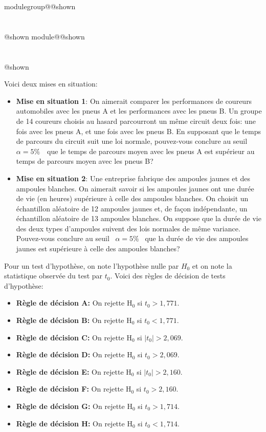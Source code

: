 \documentclass{Evaluation}
\makeatletter
\newcommand{\currentmodulekey}{}
\newcommand{\currentmoduletitle}{}
\newcommand{\currentgroupkey}{}
\newcommand{\currentgrouptitle}{}
\newcommand{\showmoduleifneeded}{%
  \ifx\currentgroupkey\empty\else
    \expandafter\ifx\csname modulegroup@\currentgroupkey @shown\endcsname\relax
      \section*{\currentgrouptitle}%
      \expandafter\gdef\csname modulegroup@\currentgroupkey @shown\endcsname{1}%
    \fi
  \fi
  \expandafter\ifx\csname module@\currentmodulekey @shown\endcsname\relax
    \section*{\currentmoduletitle}%
    \expandafter\gdef\csname module@\currentmodulekey @shown\endcsname{1}%
  \fi
}
\newenvironment{A23}{\showmoduleifneeded}{}
\makeatother
\begin{document}
\begin{questions}
\begin{A23}
\question {} %
Voici deux mises en situation:
\begin{itemize}
    \item {\bf Mise en situation 1}: On aimerait comparer les performances de coureurs automobiles avec les pneus A et les performances avec les pneus B. Un groupe de 14 coureurs choisis au hasard parcourront un même circuit deux fois: une fois avec les pneus A, et une fois avec les pneus B. En supposant que le temps de parcours du circuit suit une loi normale, pouvez-vous conclure au seuil  $\alpha=5\%$  que le temps de parcours moyen avec les pneus A est supérieur au temps de parcours moyen avec les pneus B?
    \item {\bf Mise en situation 2}: Une entreprise fabrique des ampoules jaunes et des ampoules blanches. On aimerait savoir si les ampoules jaunes ont une durée de vie (en heures) supérieure à celle des ampoules blanches. On choisit un échantillon aléatoire de 12 ampoules jaunes et, de façon indépendante, un échantillon aléatoire de 13 ampoules blanches. On suppose que la durée de vie des deux types d'ampoules suivent des lois normales de même variance. Pouvez-vous conclure au seuil  $\alpha=5\%$  que la durée de vie des ampoules jaunes est supérieure à celle des ampoules blanches?
\end{itemize}

Pour un test d'hypothèse, on note l'hypothèse nulle par $H_0$ et on note la statistique observée du test par $t_0$. Voici des règles de décision de tests d'hypothèse:

\begin{itemize}

        \item {\bf Règle de décision A:} On rejette $\mathrm{H}_0$ si $t_0 > 1,771$.
    \item {\bf Règle de décision B:} On rejette $\mathrm{H}_0$ si $t_0 < 1,771$.

    \item {\bf Règle de décision C:}  On rejette $\mathrm{H}_0$ si $|t_0| >2,069$.
    \item {\bf Règle de décision D:}  On rejette $\mathrm{H}_0$ si $t_0 >2,069$.

        \item {\bf Règle de décision E:}  On rejette $\mathrm{H}_0$ si $|t_0| > 2,160$.
    \item {\bf Règle de décision F:} On rejette $\mathrm{H}_0$ si $t_0 > 2,160$.
    \item {\bf Règle de décision G:}  On rejette $\mathrm{H}_0$ si $t_0 > 1,714$.
    \item {\bf Règle de décision H:}  On rejette $\mathrm{H}_0$ si $t_0 < 1,714$.
\end{itemize}


\end{A23}
\end{questions}
\end{document}
